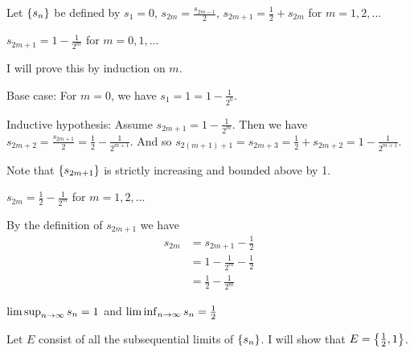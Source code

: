 \documentclass[11pt,letterpaper]{article}
\begin{document}
\begin{Problem}{3.4}
\begin{Hypothesis} Let $\left\{ s_n \right\}$ be defined by $s_1=0$, $s_{2m}=\frac{s_{2m-1}}{2}$, $s_{2m+1}=\frac{1}{2}+s_{2m}$ for $m=1,2,\ldots$  \end{Hypothesis}
\begin{Claim} $s_{2m+1} = 1 - \frac{1}{2^m}$ for $m=0,1,\ldots$ \end{Claim}
\begin{Proof}
I will prove this by induction on $m$.

Base case: For $m = 0$, we have $s_1 = 1 = 1 - \frac{1}{2^0}$.

Inductive hypothesis: Assume $s_{2m+1} = 1 - \frac{1}{2^m}$. Then we have $s_{2m+2} = \frac{s_{2m+1}}{2}=\frac{1}{2}-\frac{1}{2^{m+1}}$. And so $s_{2(m+1)+1} = s_{2m+3} = \frac{1}{2}+s_{2m+2} = 1-\frac{1}{2^{m+1}}$.

Note that $\left\{ s_{2m+1} \right\}$ is strictly increasing and bounded above by 1.
\end{Proof}
\begin{Claim} $s_{2m} = \frac{1}{2} - \frac{1}{2^m}$ for $m=1,2,\ldots$ \end{Claim}
\begin{Proof}
By the definition of $s_{2m+1}$ we have 
\begin{align*}
    s_{2m} &= s_{2m+1}-\frac{1}{2} \\
    &= 1-\frac{1}{2^m}-\frac{1}{2} \\
    &= \frac{1}{2} - \frac{1}{2^m}
\end{align*}
\end{Proof}
\begin{Claim} $\limsup_{n \rightarrow \infty}s_n = 1$ and $\liminf_{n \rightarrow \infty}s_n = \frac{1}{2}$ \end{Claim}
\begin{Proof}
Let $E$ consist of all the subsequential limits of $\left\{ s_n \right\}$. I will show that $E=\left\{ \frac{1}{2},1 \right\}$.


\end{Proof}
\end{Problem}
\end{document}
